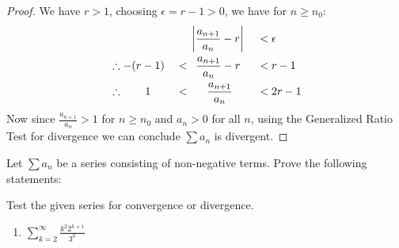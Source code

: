 \documentclass[week=6]{homework}
\begin{document}
\begin{questions}
\begin{parts}
\begin{proof}
	    		We have $r > 1$, choosing $\epsilon = r-1 > 0$, we have for $n \geq n_0$:
	    		\begin{alignat*}{3}
	    		& && \hspace{13pt} \left| \frac{a_{n+1}}{a_n} - r \right| &&< \epsilon\\
	    		&\therefore -(r-1) &&< \enskip\frac{a_{n+1}}{a_n} - r \enskip &&< r-1 \\
	    		&\therefore \qquad 1 &&< \enskip\enskip\enskip \frac{a_{n+1}}{a_n} \enskip &&< 2r-1 \\
	    		\end{alignat*}
	    		Now since $\frac{a_{n+1}}{a_n} > 1$ for $n \geq n_0$ and $a_n > 0$ for all $n$, using the Generalized Ratio Test for divergence we can conclude $\sum a_n$ is divergent. 
	    	\end{proof}
	    \end{parts}
    
	    \question
	    Let $\sum a_n$ be a series consisting of non-negative terms. Prove the following statements:
    
	    \question
	    Test the given series for convergence or divergence.
	    \begin{enumerate}[label=(\alph*)]
	    	\item $\displaystyle \sum_{k=2}^{\infty} \frac{k^2 2^{k+1}}{3^k}$
	    	

\end{enumerate}
\end{questions}
\end{document}
